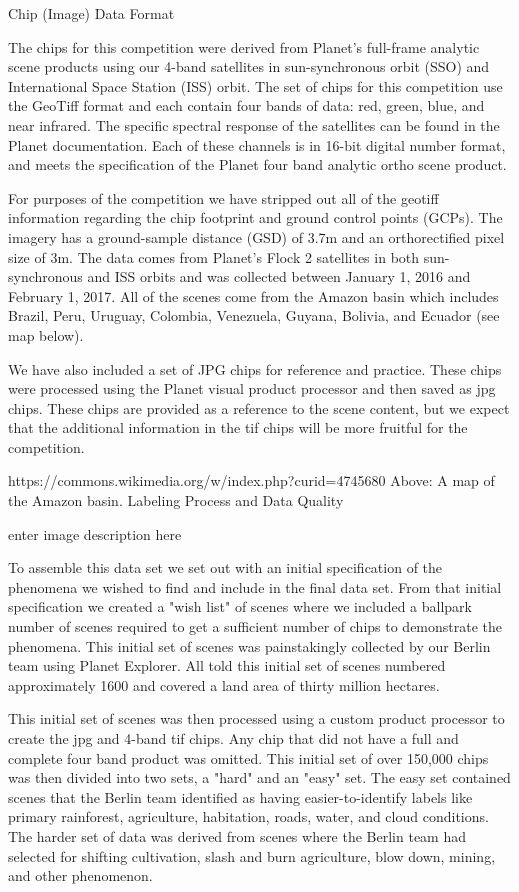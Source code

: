 Chip (Image) Data Format

The chips for this competition were derived from Planet's full-frame analytic scene products using our 4-band satellites in sun-synchronous orbit (SSO) and International Space Station (ISS) orbit. The set of chips for this competition use the GeoTiff format and each contain four bands of data: red, green, blue, and near infrared. The specific spectral response of the satellites can be found in the Planet documentation. Each of these channels is in 16-bit digital number format, and meets the specification of the Planet four band analytic ortho scene product.

For purposes of the competition we have stripped out all of the geotiff information regarding the chip footprint and ground control points (GCPs). The imagery has a ground-sample distance (GSD) of 3.7m and an orthorectified pixel size of 3m. The data comes from Planet's Flock 2 satellites in both sun-synchronous and ISS orbits and was collected between January 1, 2016 and February 1, 2017. All of the scenes come from the Amazon basin which includes Brazil, Peru, Uruguay, Colombia, Venezuela, Guyana, Bolivia, and Ecuador (see map below).

We have also included a set of JPG chips for reference and practice. These chips were processed using the Planet visual product processor and then saved as jpg chips. These chips are provided as a reference to the scene content, but we expect that the additional information in the tif chips will be more fruitful for the competition.

https://commons.wikimedia.org/w/index.php?curid=4745680 Above: A map of the Amazon basin.
Labeling Process and Data Quality

enter image description here

To assemble this data set we set out with an initial specification of the phenomena we wished to find and include in the final data set. From that initial specification we created a "wish list" of scenes where we included a ballpark number of scenes required to get a sufficient number of chips to demonstrate the phenomena. This initial set of scenes was painstakingly collected by our Berlin team using Planet Explorer. All told this initial set of scenes numbered approximately 1600 and covered a land area of thirty million hectares.

This initial set of scenes was then processed using a custom product processor to create the jpg and 4-band tif chips. Any chip that did not have a full and complete four band product was omitted. This initial set of over 150,000 chips was then divided into two sets, a "hard" and an "easy" set. The easy set contained scenes that the Berlin team identified as having easier-to-identify labels like primary rainforest, agriculture, habitation, roads, water, and cloud conditions. The harder set of data was derived from scenes where the Berlin team had selected for shifting cultivation, slash and burn agriculture, blow down, mining, and other phenomenon.

